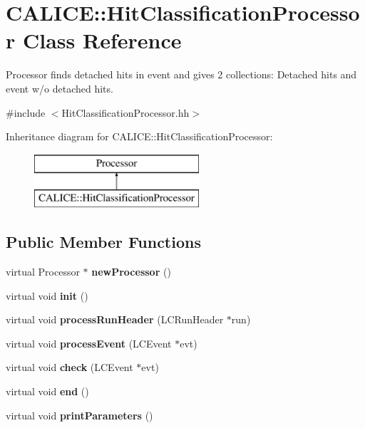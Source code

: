 \section{C\-A\-L\-I\-C\-E\-:\-:Hit\-Classification\-Processor Class Reference}
\label{classCALICE_1_1HitClassificationProcessor}


Processor finds detached hits in event and gives 2 collections\-: Detached hits and event w/o detached hits.  




{\ttfamily \#include $<$Hit\-Classification\-Processor.\-hh$>$}

Inheritance diagram for C\-A\-L\-I\-C\-E\-:\-:Hit\-Classification\-Processor\-:\begin{figure}[H]
\begin{center}
\leavevmode
\includegraphics[height=2.000000cm]{classCALICE_1_1HitClassificationProcessor}
\end{center}
\end{figure}
\subsection*{Public Member Functions}
\begin{DoxyCompactItemize}
\item 
virtual Processor $\ast$ {\bfseries new\-Processor} ()\label{classCALICE_1_1HitClassificationProcessor_a955e933140dd61e6872006ae87b03dbb}

\item 
virtual void {\bfseries init} ()\label{classCALICE_1_1HitClassificationProcessor_aa32a1e394d3603fb4f3bb5f53e6ed763}

\item 
virtual void {\bfseries process\-Run\-Header} (L\-C\-Run\-Header $\ast$run)\label{classCALICE_1_1HitClassificationProcessor_a5c3bcde173f33d807daefb887bbae3b9}

\item 
virtual void {\bfseries process\-Event} (L\-C\-Event $\ast$evt)\label{classCALICE_1_1HitClassificationProcessor_ad4f0b48757846cfd3124daac76b60e5a}

\item 
virtual void {\bfseries check} (L\-C\-Event $\ast$evt)\label{classCALICE_1_1HitClassificationProcessor_a96bed7213ac43218cc0d4244e2080820}

\item 
virtual void {\bfseries end} ()\label{classCALICE_1_1HitClassificationProcessor_ab2715b8619f2fa7209df2a3a8032ff4e}

\item 
virtual void {\bfseries print\-Parameters} ()\label{classCALICE_1_1HitClassificationProcessor_addd70f96ba47f8df876699d21e5425ff}

\end{DoxyCompactItemize}
